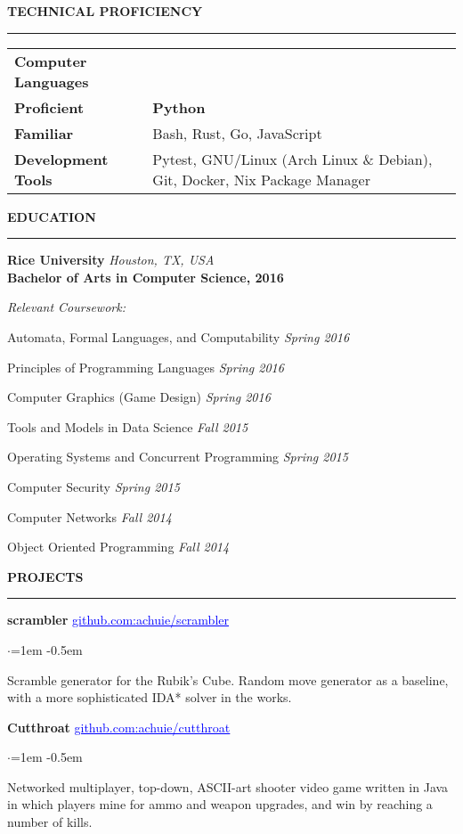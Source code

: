 \documentclass[10pt, a4paper]{article}
\newenvironment{aSection}[1]{
    \medskip \textbf{\uppercase{#1}}
    \smallskip
    \hrule
    \begin{list}{}{
            \setlength{\leftmargin}{1.5em}
        }
    \item[]
    }{
    \end{list}
}
\newenvironment{projSubsection}[2]{
    {#1} \hfill {#2}
    \smallskip
    \begin{list}{$\cdot$}{\leftmargin=1em}
    \itemsep -0.5em \vspace{-0.5em}
    }{
    \end{list}
    \vspace{0.5em}
}
\begin{document}
\begin{aSection}{Technical Proficiency}
    \begin{tabularx}{\textwidth}{@{}>{\bfseries}l X@{}}
        Computer Languages \\
        \quad Proficient & \textbf{Python}\\
        \quad Familiar & Bash, Rust, Go, JavaScript\\
        Development Tools & Pytest, GNU/Linux (Arch Linux \& Debian), Git, Docker, Nix Package
            Manager
    \end{tabularx}
\end{aSection}

\begin{aSection}{Education} \textbf{Rice University} \hfill \textit{Houston, TX, USA}\\
    \textbf{Bachelor of Arts in Computer Science, 2016}

    \textit{Relevant Coursework:}
    \item Automata, Formal Languages, and Computability \hfill{\em Spring 2016}
    \item Principles of Programming Languages \hfill{\em Spring 2016}
    \item Computer Graphics (Game Design) \hfill{\em Spring 2016}
    \item Tools and Models in Data Science \hfill{\em Fall 2015}
    \item Operating Systems and Concurrent Programming \hfill{\em Spring 2015}
    \item Computer Security \hfill{\em Spring 2015} \item Computer Networks \hfill{\em Fall 2014}
    \item Object Oriented Programming \hfill{\em Fall 2014}
\end{aSection}

\begin{aSection}{Projects}
    \begin{projSubsection}
        {\textbf{scrambler}}
        {\href{https://www.github.com/achuie/scrambler}{\textcolor{blue}{\underline{github.com:achuie/scrambler}}}}
    \item[] Scramble generator for the Rubik's Cube. Random move
        generator as a baseline, with a more sophisticated IDA* solver in the
        works.
    \end{projSubsection}

    \begin{projSubsection}
        {\textbf{Cutthroat}}
        {\href{https://www.github.com/achuie/cutthroat}{\textcolor{blue}{\underline{github.com:achuie/cutthroat}}}}
    \item[] Networked multiplayer, top-down, ASCII-art shooter video game written in Java in which
        players mine for ammo and weapon upgrades, and win by reaching a number of kills.
    \end{projSubsection}
\end{aSection}
\end{document}
